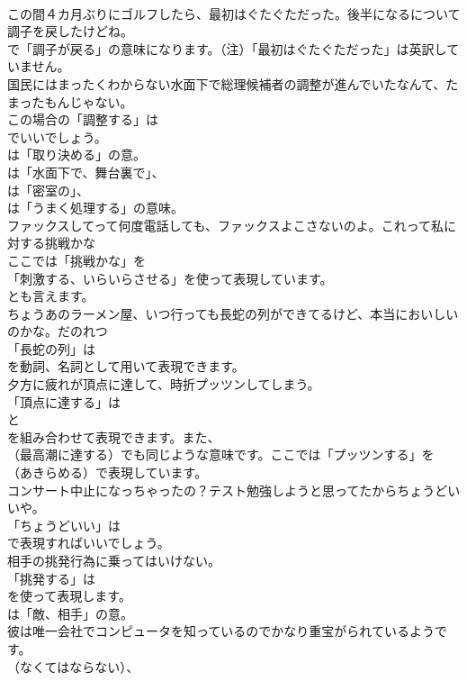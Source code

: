 \documentclass[8pt]{extreport}
\begin{document}
\begin{CJK}{UTF8}{min}
\\	この間４カ月ぶりにゴルフしたら、最初はぐたぐただった。後半になるについて調子を戻したけどね。 
\\	で「調子が戻る」の意味になります。（注）「最初はぐたぐただった」は英訳していません。	
\\	国民にはまったくわからない水面下で総理候補者の調整が進んでいたなんて、たまったもんじゃない。 
\\	この場合の「調整する」は
\\	でいいでしょう。
\\	は「取り決める」の意。
\\	は「水面下で、舞台裏で」、
\\	は「密室の」、
\\	は「うまく処理する」の意味。	
\\	ファックスしてって何度電話しても、ファックスよこさないのよ。これって私に対する挑戦かな 
\\	ここでは「挑戦かな」を
\\	「刺激する、いらいらさせる」を使って表現しています。
\\	とも言えます。	
\\	ちょうあのラーメン屋、いつ行っても長蛇の列ができてるけど、本当においしいのかな。だのれつ 
\\	「長蛇の列」は 
\\	を動詞、名詞として用いて表現できます。	
\\	夕方に疲れが頂点に達して、時折プッツンしてしまう。 
\\	「頂点に達する」は
\\	と
\\	を組み合わせて表現できます。また、
\\	（最高潮に達する）でも同じような意味です。ここでは「プッツンする」を
\\	（あきらめる）で表現しています。	
\\	コンサート中止になっちゃったの？テスト勉強しようと思ってたからちょうどいいや。 
\\	「ちょうどいい」は 
\\	で表現すればいいでしょう。	
\\	相手の挑発行為に乗ってはいけない。 
\\	「挑発する」は 
\\	を使って表現します。
\\	は「敵、相手」の意。	
\\	彼は唯一会社でコンピュータを知っているのでかなり重宝がられているようです。 
\\	（なくてはならない）、

\end{CJK}
\end{document}
